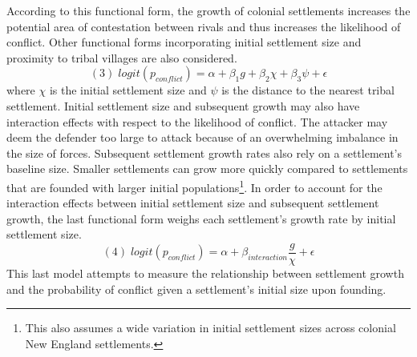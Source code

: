 \documentclass[11pt]{article}
\begin{document}
According to this functional form, the growth of colonial settlements increases the potential area of contestation between rivals and thus increases the likelihood of conflict. Other functional forms incorporating initial settlement size and proximity to tribal villages are also considered.
$$ (3) \;logit(p_{conflict})= \alpha + \beta_{1}g + \beta_{2}\chi + \beta_{3}\psi + \epsilon $$
where $\chi$ is the initial settlement size and $\psi$ is the distance to the nearest tribal settlement. Initial settlement size and subsequent growth may also have interaction effects with respect to the likelihood of conflict. The attacker may deem the defender too large to attack because of an overwhelming imbalance in the size of forces. Subsequent settlement growth rates also rely on a settlement's baseline size. Smaller settlements can grow more quickly compared to settlements that are founded with larger initial populations\footnote{This also assumes a wide variation in initial settlement sizes across colonial New England settlements.}. In order to account for the interaction effects between initial settlement size and subsequent settlement growth, the last functional form weighs each settlement's growth rate by initial settlement size.
$$ (4)\; logit(p_{conflict})= \alpha + \beta_{interaction}\frac{g}{\chi} + \epsilon $$
This last model attempts to measure the relationship between settlement growth and the probability of conflict given a settlement's initial size upon founding.
\end{document}

